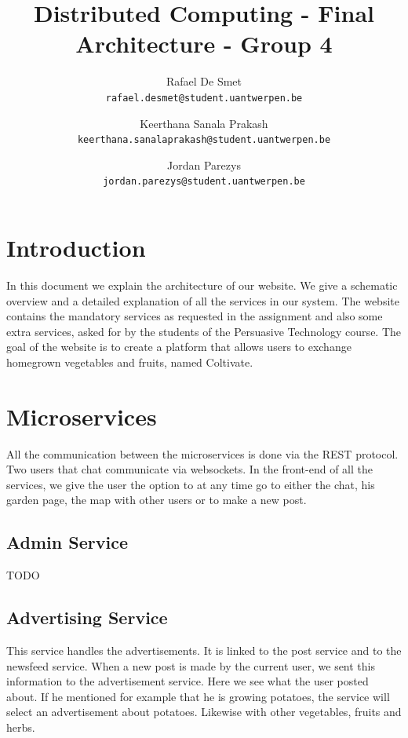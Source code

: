 \documentclass[a4paper,12pt]{article}
\begin{document}
\title{Distributed Computing - Final Architecture - Group 4}
\author{ Rafael De Smet \\
  \texttt{rafael.desmet@student.uantwerpen.be}  \and
  Keerthana Sanala Prakash \\
  \texttt{keerthana.sanalaprakash@student.uantwerpen.be} \and
  Jordan Parezys \\
  \texttt{jordan.parezys@student.uantwerpen.be}}
\date{}
\maketitle

\section{Introduction}

In this document we explain the architecture of our website. We give a schematic overview and a detailed explanation of all the services in our system. The website contains the mandatory services as requested in the assignment and also some extra services, asked for by the students of the Persuasive Technology course. The goal of the website is to create a platform that allows users to exchange homegrown vegetables and fruits, named Coltivate.

\section{Microservices}

All the communication between the microservices is done via the REST protocol. Two users that chat communicate via websockets. In the front-end of all the services, we give the user the option to at any time go to either the chat, his garden page, the map with other users or to make a new post.

\subsection{Admin Service}

TODO

\subsection{Advertising Service}

This service handles the advertisements. It is linked to the post service and to the newsfeed service. When a new post is made by the current user, we sent this information to the advertisement service. Here we see what the user posted about. If he mentioned for example that he is growing potatoes, the service will select an advertisement about potatoes. Likewise with other vegetables, fruits and herbs.
\newline
\end{document}
